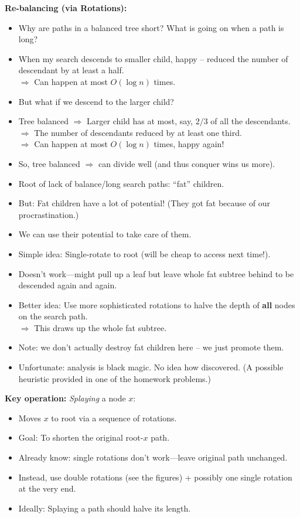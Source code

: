 \documentclass{article}
\begin{document}
{\bf Re-balancing (via Rotations):}
\begin{itemize}
\item Why are paths in a balanced tree short? What is going on when a path is long?
\item  When my search descends to smaller child, happy -- reduced the number of descendant by at least a half. \\
$\Rightarrow$ Can happen at most $O(\log n)$ times.
\item But what if we descend to the larger child?
\item Tree balanced $\Rightarrow$ Larger child has at most, say, $2/3$ of all the descendants.\\
$\Rightarrow$ The number of descendants reduced by at least one third.\\
$\Rightarrow$ Can happen at most $O(\log n)$ times, happy again!
\item So, tree balanced $\Rightarrow$ can divide well (and thus conquer wins us more).
\item Root of lack of balance/long search paths: ``fat'' children.
\item But: Fat children have a lot of potential! (They got fat because of our procrastination.)
\item We can use their potential to take care of them.
\item Simple idea: Single-rotate to root (will be cheap to access next time!). 
\item  Doesn't work---might pull up a leaf but leave whole fat subtree behind to be descended again and again.
\item Better idea: Use more sophisticated rotations to halve the depth of {\bf
    all} nodes on the search path.\\
    $\Rightarrow$ This draws up the whole fat subtree.
\item Note: we don't actually destroy fat children here -- we just promote them.
\item Unfortunate: analysis is black magic.  No idea how discovered. (A possible heuristic provided in one of the homework problems.)
\end{itemize}

{\bf Key operation:}  {\em Splaying} a node $x$:
\begin{itemize}
\item Moves $x$ to root via a sequence of rotations.
\item Goal: To shorten the original root-$x$ path.
\item Already know: single rotations don't work---leave original path unchanged.
\item Instead, use double rotations (see the figures) + possibly one single rotation at the very end.
\item Ideally: Splaying a path should halve its length.
\end{itemize}
\end{document}

